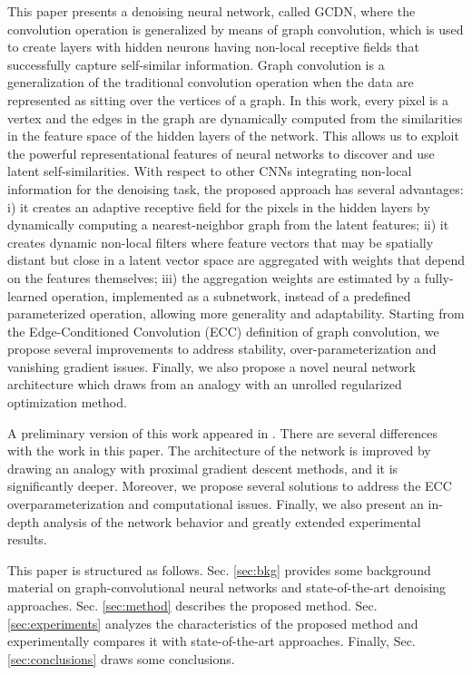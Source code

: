 \documentclass[journal]{IEEEtran}
\begin{document}
This paper presents a denoising neural network, called GCDN, where the convolution operation is generalized by means of graph convolution, which is used to create layers with hidden neurons having non-local receptive fields that successfully capture self-similar information. Graph convolution is a generalization of the traditional convolution operation when the data are represented as sitting over the vertices of a graph. In this work, every pixel is a vertex and the edges in the graph are dynamically computed from the similarities in the feature space of the hidden layers of the network. This allows us to exploit the powerful representational features of neural networks to discover and use latent self-similarities. With respect to other CNNs integrating non-local information for the denoising task, the proposed approach has several advantages: i) it creates an adaptive receptive field for the pixels in the hidden layers by dynamically computing a nearest-neighbor graph from the latent features; ii) it creates dynamic non-local filters where feature vectors that may be spatially distant but close in a latent vector space are aggregated with weights that depend on the features themselves; iii) the aggregation weights are estimated by a fully-learned operation, implemented as a subnetwork, instead of a predefined parameterized operation, allowing more generality and adaptability. Starting from the Edge-Conditioned Convolution (ECC) definition of graph convolution, we propose several improvements to address stability, over-parameterization and vanishing gradient issues. Finally, we also propose a novel neural network architecture which draws from an analogy with an unrolled regularized optimization method.

A preliminary version of this work appeared in \cite{ValsesiaICIP19}. There are several differences with the work in this paper. The architecture of the network is improved by drawing an analogy with proximal gradient descent methods, and it is significantly deeper. Moreover, we propose several solutions to address the ECC overparameterization and computational issues. Finally, we also present an in-depth analysis of the network behavior and greatly extended experimental results.

This paper is structured as follows. Sec. \ref{sec:bkg} provides some background material on graph-convolutional neural networks and state-of-the-art denoising approaches. Sec. \ref{sec:method} describes the proposed method. Sec. \ref{sec:experiments} analyzes the characteristics of the proposed method and experimentally compares it with state-of-the-art approaches. Finally, Sec. \ref{sec:conclusions} draws some conclusions.
\end{document}
